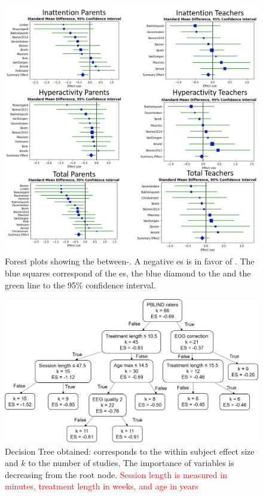 \begin{figure}[h!]
  \centering
  \includegraphics[width=1.0\linewidth]{figures/meta_review_forest_plots_update_meta_analysis_our_choices_no_colors_2-columns_fitting_image.jpg}
  \caption{Forest plots showing the between-. A negative \gls{es} is in favor of . 
	The blue squares correspond of the \gls{es}, the blue diamond to the  and the green line to the 95\% confidence interval.}
  \label{Figure:meta_review_forest_plots_update_meta_analysis_our_choices_no_colors_2-columns_fitting_image}
\end{figure}

\begin{figure}[h!]
  \centering
  \includegraphics[width=1.0\linewidth]{figures/factors_analysis_decision_tree_results_no_colors_2-columns_fitting_image.jpg}
  \caption{Decision Tree obtained:  corresponds to the within subject effect size and $k$ to the number of studies, 
  The importance of variables is decreasing from the root node. \textcolor{red}{Session length is measured in minutes, treatment length in weeks, and age in years}}
  \label{Figure:factors_analysis_decision_tree_results}
\end{figure}


